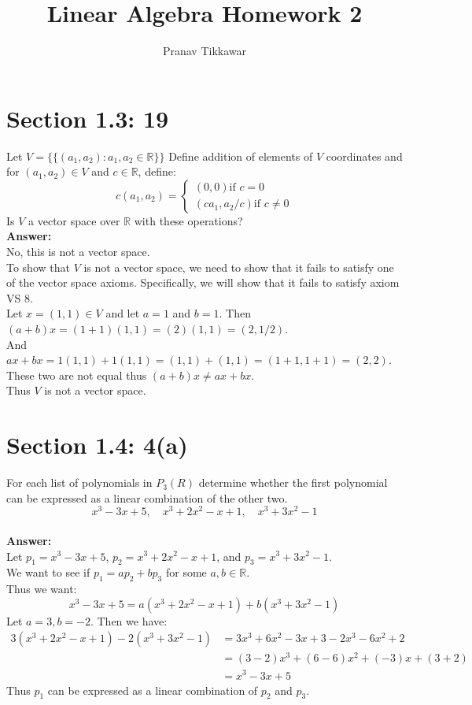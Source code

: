 \documentclass{article}
\author{Pranav Tikkawar}
\title{Linear Algebra Homework 2}
\begin{document}
\maketitle

\section*{Section 1.3: 19}
Let $V = \{ \{ (a_1,a_2): a_1, a_2 \in \mathds{R}\} \}$ Define addition of elements of $V$ coordinates and for $(a_1,a_2) \in V$ and $c \in \mathds{R}$, define:
$$c(a_1, a_2)=
\begin{cases}
    (0,0) \text{if } c = 0 \\
    (ca_1, a_2/c) \text{if } c \neq 0
\end{cases}
$$
Is $V$ a vector space over $\mathds{R}$ with these operations?\\
\textbf{Answer:} \\
No, this is not a vector space.\\
To show that $V$ is not a vector space, we need to show that it fails to satisfy one of the vector space axioms. Specifically, we will show that it fails to satisfy axiom VS 8.\\
Let $x = (1,1) \in V$ and let $a = 1$ and $b = 1$. Then $(a+b)x = (1+1)(1,1) = (2)(1,1) = (2,1/2)$.\\
And $ax + bx = 1(1,1) + 1(1,1) = (1,1) + (1,1) = (1+1, 1+1) = (2,2)$.\\
These two are not equal thus $(a+b)x \neq ax + bx$.\\
Thus $V$ is not a vector space.\\
\section*{Section 1.4: 4(a)}
For each list of polynomials in $P_3(R)$ determine whether the first polynomial can be expressed as a linear combination of the other two.\\
$$ x^3 - 3x + 5, \quad x^3 + 2x^2 - x +1, \quad x^3 +3 x^2 - 1 $$\\
\textbf{Answer:}\\
Let $p_1 = x^3 - 3x + 5$, $p_2 = x^3 + 2x^2 - x + 1$, and $p_3 = x^3 + 3x^2 - 1$.\\

We want to see if $p_1 = ap_2 + bp_3$ for some $a,b \in \mathds{R}$.\\
Thus we want:
$$ x^3 - 3x + 5 = a(x^3 + 2x^2 - x + 1) + b(x^3 + 3x^2 - 1) $$
Let $a = 3, b = -2$. Then we have:
\begin{align*}
    3(x^3 + 2x^2 - x + 1) - 2(x^3 + 3x^2 - 1) &= 3x^3 + 6x^2 - 3x + 3 - 2x^3 - 6x^2 + 2 \\
    &= (3-2)x^3 + (6-6)x^2 + (-3)x + (3+2)\\ 
    &= x^3 - 3x + 5
\end{align*}
Thus $p_1$ can be expressed as a linear combination of $p_2$ and $p_3$.\\
\end{document}
